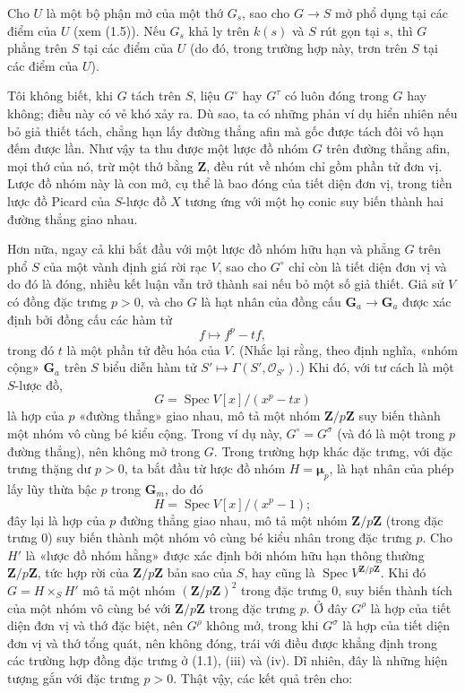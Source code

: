 Cho $U$ là một bộ phận mở của một thớ $G_s$, sao cho
$G\longrightarrow S$ mở phổ dụng tại các điểm của $U$ (xem (1.5)). Nếu $G_s$
khả ly trên $k(s)$ và $S$ rút gọn tại $s$, thì $G$ phẳng trên $S$ tại các điểm
của $U$ (do đó, trong trường hợp này, trơn trên $S$ tại các điểm của $U$).

 Tôi không biết, khi $G$ tách trên $S$, liệu
$G^\circ$ hay $G^\tau$ có luôn đóng trong $G$ hay không; điều này có vẻ khó xảy
ra. Dù sao, ta có những phản ví dụ hiển nhiên nếu bỏ giả thiết tách, chẳng hạn
lấy đường thẳng afin mà gốc được tách đôi vô hạn đếm được lần. Như vậy ta thu
được một lược đồ nhóm $G$ trên đường thẳng afin, mọi thớ của nó, trừ một thớ
bằng $\mathbf Z$, đều rút về nhóm chỉ gồm phần tử đơn vị. Lược đồ nhóm này là
con mở, cụ thể là bao đóng của tiết diện đơn vị, trong tiền lược đồ Picard của
$S$-lược đồ $X$ tương ứng với một họ conic suy biến thành hai đường thẳng giao
nhau.

Hơn nữa, ngay cả khi bắt đầu với một lược đồ nhóm hữu hạn và phẳng $G$ trên
phổ $S$ của một vành định giá rời rạc $V$, sao cho $G^\circ$ chỉ còn là tiết
diện đơn vị và do đó là đóng, nhiều kết luận vẫn trở thành sai nếu bỏ một số
giả thiết. Giả sử $V$ có đồng đặc trưng $p>0$, và cho $G$ là hạt nhân của đồng
cấu
$\mathbf G_a\longrightarrow\mathbf G_a$ được xác định bởi đồng cấu các hàm tử
\[
f\longmapsto f^p-tf,
\]
trong đó $t$ là một phần tử đều hóa của $V$.
(Nhắc lại rằng, theo định nghĩa, «nhóm cộng» $\mathbf G_a$ trên $S$ biểu diễn
hàm tử $S'\longmapsto\Gamma(S',\mathcal O_{S'})$.) Khi đó, với tư cách là một
$S$-lược đồ,
\[
G=\operatorname{Spec}V[x]/(x^p-tx)
\]
là hợp của $p$ «đường thẳng» giao nhau, mô tả một nhóm
$\mathbf Z/p\mathbf Z$ suy biến thành một nhóm vô cùng bé kiểu cộng. Trong ví
dụ này, $G^\circ=G^\sigma$ (và đó là một trong $p$ đường thẳng), nên không mở
trong $G$. Trong trường hợp khác đặc trưng, với đặc trưng thặng dư $p>0$, ta
bắt đầu từ lược đồ nhóm $H=\symbf{\mu}_p$, là hạt nhân của phép lấy lũy thừa
bậc $p$ trong $\mathbf G_m$, do đó
\[
H=\operatorname{Spec}V[x]/(x^p-1) ;
\]
đây lại là hợp của $p$ đường thẳng giao nhau, mô tả một nhóm
$\mathbf Z/p\mathbf Z$ (trong đặc trưng 0) suy biến thành một nhóm vô cùng bé
kiểu nhân trong đặc trưng $p$. Cho $H'$ là «lược đồ nhóm hằng» được xác định
bởi nhóm hữu hạn thông thường $\mathbf Z/p\mathbf Z$, tức hợp rời của
$\mathbf Z/p\mathbf Z$ bản sao của $S$, hay cũng là
$\operatorname{Spec}V^{\mathbf Z/p\mathbf Z}$. Khi đó $G=H\times_S H'$ mô tả
một nhóm $(\mathbf Z/p\mathbf Z)^2$ trong đặc trưng 0, suy biến thành tích của
một nhóm vô cùng bé với $\mathbf Z/p\mathbf Z$ trong đặc trưng $p$. Ở đây
$G^\rho$ là hợp của tiết diện đơn vị và thớ đặc biệt, nên $G^\rho$ không mở,
trong khi $G^\sigma$ là hợp của tiết diện đơn vị và thớ tổng quát, nên không
đóng, trái với điều được khẳng định trong các trường hợp đồng đặc trưng ở
(1.1), (iii) và (iv). Dĩ nhiên, đây là những hiện tượng gắn với đặc trưng
$p>0$. Thật vậy, các kết quả trên cho:

